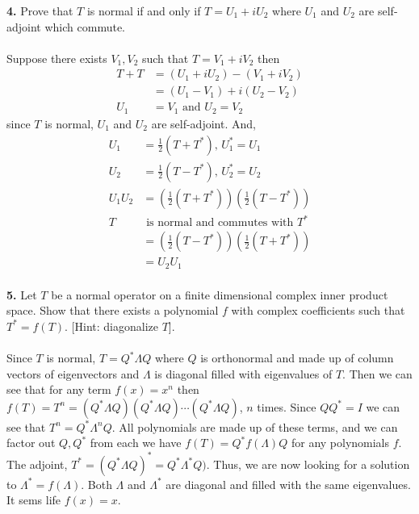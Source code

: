 \documentclass[11pt]{amsart}
\theoremstyle{definition}  %
\begin{document}
\newpage
\vskip 0.1cm
\noindent
{\bf 4.} Prove that $T$ is normal if and only if $T = U_1 + i U_2$ where $U_1$ and $U_2$ are self-adjoint which commute.  \\
\\Suppose there exists $V_1, V_2$ such that $T=V_1+iV_2$ then 
\begin{align*}
	T+T &= (U_1 + i U_2)-(V_1+iV_2) \\
	&= (U_1-V_1) +i(U_2-V_2)\\
	U_1&= V_1 \text{ and } U_2=V_2
\end{align*}since $T$ is normal, $U_1$ and $U_2$ are self-adjoint.  And,
\begin{align*}
	U_1&=\frac{1}{2}(T+T^*), \,U_1^*=U_1\\
	U_2&=\frac{1}{2}(T-T^*), \,U_2^*=U_2\\
	U_1U_2 &= \left(\frac{1}{2}(T+T^*)\right)\left( \frac{1}{2}(T-T^*)\right)\\
	T &\text{ is normal and commutes with } T^*\\
	&= \left( \frac{1}{2}(T-T^*)\right)\left(\frac{1}{2}(T+T^*)\right)\\
	&= U_2U_1\\
\end{align*}

\vskip 0.1cm
\noindent
{\bf 5.}  Let $T$ be a normal operator on a finite dimensional complex inner product space. Show that there exists a polynomial $f$ with complex 
coefficients such that $T^* = f(T)$. [Hint: diagonalize $T$].\\
\\
Since $T$ is normal, $T=Q^*\Lambda Q$ where $Q$ is orthonormal and made up of column vectors of eigenvectors and $\Lambda$ is diagonal filled with eigenvalues of $T$.  Then we can see that for any term $f(x)=x^n$ then $f(T)=T^n = (Q^*\Lambda Q)(Q^*\Lambda Q)\cdots(Q^*\Lambda Q)$, $n$ times.  Since $QQ^*=I$ we can see that $T^n=Q^*\Lambda ^n Q$.  All polynomials are made up of these terms, and we can factor out $Q, Q^*$ from each we have $f(T)=Q^*f(\Lambda)Q$ for any polynomials $f$. The adjoint, $T^*=(Q^*\Lambda Q)^* = Q^*\Lambda^* Q)$.  Thus, we are now looking for a solution to $\Lambda^*=f(\Lambda)$.  Both $\Lambda$ and $\Lambda^*$ are diagonal and filled with the same eigenvalues.  It sems life $f(x)=x$.\\
\end{document}
